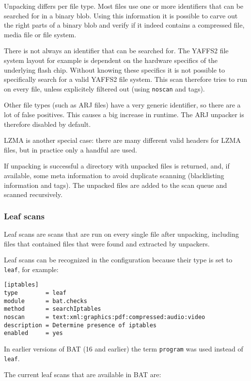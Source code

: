 \documentclass[10pt]{article}
\begin{document}
Unpacking differs per file type. Most files use one or more identifiers that
can be searched for in a binary blob. Using this information it is possible
to carve out the right parts of a binary blob and verify if it indeed contains
a compressed file, media file or file system.

There is not always an identifier that can be searched for. The YAFFS2 file
system layout for example is dependent on the hardware specifics of the
underlying flash chip. Without knowing these specifics it is not possible to
specifically search for a valid YAFFS2 file system. This scan therefore tries
to run on every file, unless explicitely filtered out (using \texttt{noscan}
and tags).

Other file types (such as ARJ files) have a very generic identifier, so there
are a lot of false positives. This causes a big increase in runtime. The ARJ
unpacker is therefore disabled by default.

LZMA is another special case: there are many different valid headers for LZMA
files, but in practice only a handful are used.

If unpacking is successful a directory with unpacked files is returned, and, if
available, some meta information to avoid duplicate scanning (blacklisting
information and tags). The unpacked files are added to the scan queue and
scanned recursively.

\subsubsection{Leaf scans}

Leaf scans are scans that are run on every single file after unpacking,
including files that contained files that were found and extracted by unpackers.

Leaf scans can be recognized in the configuration because their type is set to
\texttt{leaf}, for example:

\begin{verbatim}
[iptables]
type        = leaf
module      = bat.checks
method      = searchIptables
noscan      = text:xml:graphics:pdf:compressed:audio:video
description = Determine presence of iptables
enabled     = yes
\end{verbatim}

In earlier versions of BAT (16 and earlier) the term \texttt{program} was used
instead of \texttt{leaf}.

The current leaf scans that are available in BAT are:
\end{document}
